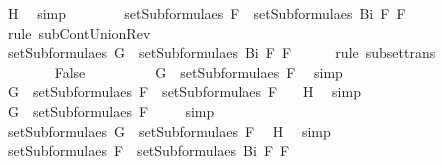 \begin{isabellebody}
\ H{}\ \isamarkupfalse%
\ simp\isanewline
\ \ \ \ \ \ \isamarkupfalse%
\ {}{\isacharcolon}{\isachardoublequoteopen}setSubformulae{\isacharunderscore}s\ F{}\ {\isasymsubseteq}\ setSubformulae{\isacharunderscore}s\ {\isacharparenleft}Bi\ F{}\ F{}{\isacharparenright}{\isachardoublequoteclose}\ \isamarkupfalse%
\ {}\ \isamarkupfalse%
\ {\isacharparenleft}rule\ subContUnionRev{}{\isacharparenright}\ \ \isanewline
\ \ \ \ \ \ \isamarkupfalse%
\ {\isachardoublequoteopen}setSubformulae{\isacharunderscore}s\ G\ {\isasymsubseteq}\ setSubformulae{\isacharunderscore}s\ {\isacharparenleft}Bi\ F{}\ F{}{\isacharparenright}{\isachardoublequoteclose}\ \isamarkupfalse%
\ {}\ {}\ \isamarkupfalse%
\ {\isacharparenleft}rule\ subset{\isacharunderscore}trans{\isacharparenright}\isanewline
\ \ \ \ \isamarkupfalse%
\isanewline
\ \ \ \ \ \ \isamarkupfalse%
\ False\isanewline
\ \ \ \ \ \ \isamarkupfalse%
\ \isamarkupfalse%
\ {}{\isacharcolon}{\isachardoublequoteopen}G\ {\isasymnotin}\ setSubformulae{\isacharunderscore}s\ F{}{\isachardoublequoteclose}\ \isamarkupfalse%
\ simp\isanewline
\ \ \ \ \ \ \isamarkupfalse%
\ {\isachardoublequoteopen}G\ {\isasymin}\ setSubformulae{\isacharunderscore}s\ F{}\ {\isasymunion}\ setSubformulae{\isacharunderscore}s\ F{}{\isachardoublequoteclose}\ \isamarkupfalse%
\ {}\ H{}\ \isamarkupfalse%
\ simp\isanewline
\ \ \ \ \ \ \isamarkupfalse%
\ \isamarkupfalse%
\ {\isachardoublequoteopen}G\ {\isasymin}\ setSubformulae{\isacharunderscore}s\ F{}{\isachardoublequoteclose}\ \isamarkupfalse%
\ {}\ \isamarkupfalse%
\ simp\isanewline
\ \ \ \ \ \ \isamarkupfalse%
\ \isamarkupfalse%
\ {}{}{\isacharcolon}{\isachardoublequoteopen}setSubformulae{\isacharunderscore}s\ G\ {\isasymsubseteq}\ setSubformulae{\isacharunderscore}s\ F{}{\isachardoublequoteclose}\ \isamarkupfalse%
\ H{}\ \isamarkupfalse%
\ simp\isanewline
\ \ \ \ \ \ \isamarkupfalse%
\ {}{}{\isacharcolon}{\isachardoublequoteopen}setSubformulae{\isacharunderscore}s\ F{}\ {\isasymsubseteq}\ setSubformulae{\isacharunderscore}s\ {\isacharparenleft}Bi\ F{}\ F{}{\isacharparenright}{\isachardoublequoteclose}\ \isamarkupfalse%

\end{isabellebody}
